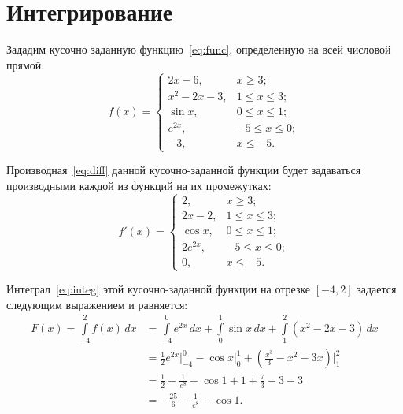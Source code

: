 \documentclass{article}
\begin{document}
\section{Интегрирование}
    Зададим кусочно заданную функцию~\eqref{eq:func}, определенную на всей числовой прямой:
    \begin{equation}
        f(x) = \begin{cases}
        2x-6, & x \geqslant 3;\\
        x^2 - 2x - 3, & 1 \leqslant x \leqslant 3;\\
        \sin{x}, & 0 \leqslant x \leqslant 1;\\
        e^{2x}, & -5 \leqslant x \leqslant 0;\\
        -3, & x \leqslant -5.
        \end{cases}
        \label{eq:func}
    \end{equation}\par
    Производная~\eqref{eq:diff} данной кусочно-заданной функции будет задаваться производными каждой из функций на их промежутках:
    \begin{equation}
        f'(x) = \begin{cases}
        2, & x \geqslant 3;\\
        2x - 2, & 1 \leqslant x \leqslant 3;\\
        \cos{x}, & 0 \leqslant x \leqslant 1;\\
        2e^{2x}, & -5 \leqslant x \leqslant 0;\\
        0, & x \leqslant -5.
        \end{cases}
        \label{eq:diff}
    \end{equation}\par
    Интеграл~\eqref{eq:integ} этой кусочно-заданной функции на отрезке $\left[-4, 2\right]$ задается следующим выражением и равняется:
    \begin{equation}
        \begin{aligned}
            F(x) = \int\limits_{-4}^{2}f(x)\,dx &= \int\limits_{-4}^{0}e^{2x}\,dx + \int\limits_{0}^{1}\sin{x}\,dx + \int\limits_{1}^{2}\left(x^2-2x-3\right)\,dx \\
            &= \frac{1}{2}e^{2x}\Biggr|_{-4}^{0} - \cos{x}\Biggr|_{0}^{1} + \left(\frac{x^3}{3} - x^2 -3x\right)\Biggr|_{1}^{2}\\
            &= \frac{1}{2} - \frac{1}{e^8} - \cos{1} + 1 + \frac{7}{3} - 3 - 3\\
            &= -\frac{25}{6} - \frac{1}{e^8} - \cos{1}.
        \end{aligned}
        \label{eq:integ}
    \end{equation}
    
\end{document}

